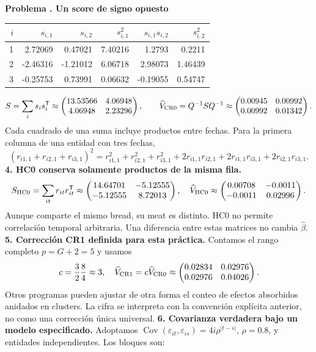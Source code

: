 \documentclass[11pt,a4paper]{article}
\newcommand{\T}{^{\mathsf T}}
\DeclareMathOperator{\Cov}{Cov}
\theoremstyle{definition}
\newcounter{problema}
\newenvironment{resuelto}[1]{\refstepcounter{problema}\par\medskip\Needspace{6\baselineskip}\textbf{Problema \theproblema. #1}\par}{\par\medskip}
\newcommand{\eps}{\varepsilon}
\begin{document}
\begin{resuelto}{Un score de signo opuesto}
\begin{center}\small
\begin{tabular}{rrrrrr}
\toprule
$i$&$s_{i,1}$&$s_{i,2}$&$s_{i,1}^2$&$s_{i,1}s_{i,2}$&$s_{i,2}^2$\\
\midrule
1&2.72069&0.47021&7.40216&1.2793&0.2211\\
2&-2.46316&-1.21012&6.06718&2.98073&1.46439\\
3&-0.25753&0.73991&0.06632&-0.19055&0.54747\\
\bottomrule
\end{tabular}
\end{center}
\[
S=\sum_i s_is_i\T\approx\begin{pmatrix}
13.53566&4.06948\\4.06948&2.23296
\end{pmatrix},\qquad \widehat V_{\rm CR0}=Q^{-1}SQ^{-1}\approx\begin{pmatrix}
0.00945&0.00992\\0.00992&0.01342
\end{pmatrix}.
\]
Cada cuadrado de una suma incluye productos entre fechas. Para la primera columna de una entidad con tres fechas,
\[
(r_{i1,1}+r_{i2,1}+r_{i3,1})^2
=r_{i1,1}^2+r_{i2,1}^2+r_{i3,1}^2
+2r_{i1,1}r_{i2,1}+2r_{i1,1}r_{i3,1}+2r_{i2,1}r_{i3,1}.
\]
\textbf{4. HC0 conserva solamente productos de la misma fila.}
\[
S_{\rm HC0}=\sum_{it}r_{it}r_{it}\T\approx\begin{pmatrix}
14.64701&-5.12555\\-5.12555&8.72013
\end{pmatrix},\quad
\widehat V_{\rm HC0}\approx\begin{pmatrix}
0.00708&-0.0011\\-0.0011&0.02996
\end{pmatrix}.
\]
Aunque comparte el mismo bread, su meat es distinto. HC0 no permite correlación temporal arbitraria. Una diferencia entre estas matrices no cambia $\widehat\beta$.
\textbf{5. Corrección CR1 definida para esta práctica.} Contamos el rango completo $p=G+2=5$ y usamos
\[
c=\frac{3}{2}\frac{8}{4}\approx3,\quad \widehat V_{\rm CR1}=c\widehat V_{\rm CR0}\approx\begin{pmatrix}
0.02834&0.02976\\0.02976&0.04026
\end{pmatrix}.
\]
Otros programas pueden ajustar de otra forma el conteo de efectos absorbidos anidados en clusters. La cifra se interpreta con la convención explícita anterior, no como una corrección única universal.
\textbf{6. Covarianza verdadera bajo un modelo especificado.} Adoptamos $\Cov(\eps_{it},\eps_{is})=4i\rho^{|t-s|}$, $\rho=0.8$, y entidades independientes. Los bloques son:

\end{resuelto}
\end{document}
